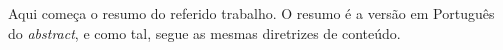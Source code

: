 Aqui começa o resumo do referido trabalho. O resumo é a versão em Português do {\em abstract}, e como tal, segue as mesmas diretrizes de conteúdo.
